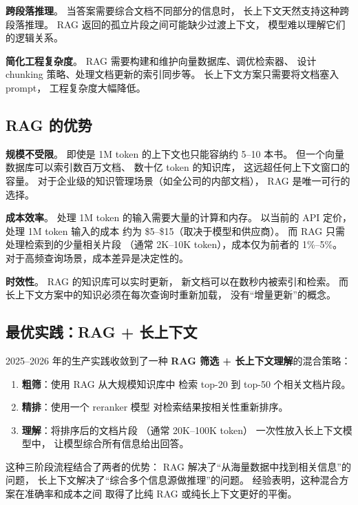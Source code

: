 \textbf{跨段落推理}。
当答案需要综合文档不同部分的信息时，
长上下文天然支持这种跨段落推理。
RAG 返回的孤立片段之间可能缺少过渡上下文，
模型难以理解它们的逻辑关系。

\textbf{简化工程复杂度}。
RAG 需要构建和维护向量数据库、调优检索器、
设计 chunking 策略、处理文档更新的索引同步等。
长上下文方案只需要将文档塞入 prompt，
工程复杂度大幅降低。

\subsection{RAG 的优势}

\textbf{规模不受限}。
即使是 1M token 的上下文也只能容纳约 5--10 本书。
但一个向量数据库可以索引数百万文档、
数十亿 token 的知识库，
这远超任何上下文窗口的容量。
对于企业级的知识管理场景（如全公司的内部文档），
RAG 是唯一可行的选择。

\textbf{成本效率}。
处理 1M token 的输入需要大量的计算和内存。
以当前的 API 定价，处理 1M token 输入的成本
约为 \$5--\$15（取决于模型和供应商）。
而 RAG 只需处理检索到的少量相关片段
（通常 2K--10K token），成本仅为前者的 1\%--5\%。
对于高频查询场景，成本差异是决定性的。

\textbf{时效性}。
RAG 的知识库可以实时更新，
新文档可以在数秒内被索引和检索。
而长上下文方案中的知识必须在每次查询时重新加载，
没有“增量更新”的概念。

\subsection{最优实践：RAG + 长上下文}

2025--2026 年的生产实践收敛到了一种
\textbf{RAG 筛选 + 长上下文理解}的混合策略：

\begin{enumerate}[noitemsep]
  \item \textbf{粗筛}：使用 RAG 从大规模知识库中
        检索 top-20 到 top-50 个相关文档片段。
  \item \textbf{精排}：使用一个 reranker 模型
        对检索结果按相关性重新排序。
  \item \textbf{理解}：将排序后的文档片段
        （通常 20K--100K token）
        一次性放入长上下文模型中，
        让模型综合所有信息给出回答。
\end{enumerate}

这种三阶段流程结合了两者的优势：
RAG 解决了“从海量数据中找到相关信息”的问题，
长上下文解决了“综合多个信息源做推理”的问题。
经验表明，这种混合方案在准确率和成本之间
取得了比纯 RAG 或纯长上下文更好的平衡。

